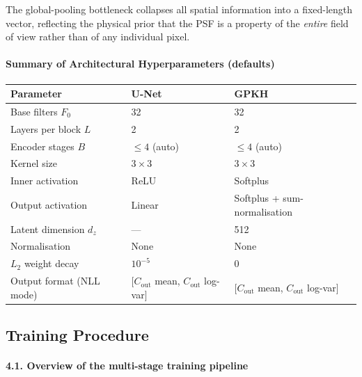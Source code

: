 \documentclass{aa}
\begin{document}
The global-pooling bottleneck collapses all spatial information into a fixed-length vector, reflecting the physical prior that the PSF is a property of the \emph{entire} field of view rather than of any individual pixel.

\paragraph{Summary of Architectural Hyperparameters (defaults)}

\begin{table}[h]
\centering
\begin{tabular}{|l|l|l|}
\hline
\textbf{Parameter} & \textbf{U-Net} & \textbf{GPKH} \\
\hline
Base filters $F_0$ & 32 & 32 \\
Layers per block $L$ & 2 & 2 \\
Encoder stages $B$ & $\leq 4$ (auto) & $\leq 4$ (auto) \\
Kernel size & $3 \times 3$ & $3 \times 3$ \\
Inner activation & ReLU & Softplus \\
Output activation & Linear & Softplus + sum-normalisation \\
Latent dimension $d_z$ & --- & 512 \\
Normalisation & None & None \\
$L_2$ weight decay & $10^{-5}$ & $0$ \\
Output format (NLL mode) & $[C_\mathrm{out}$ mean, $C_\mathrm{out}$ log-var$]$ & $[C_\mathrm{out}$ mean, $C_\mathrm{out}$ log-var$]$ \\
\hline
\end{tabular}
\end{table}


\subsection{Training Procedure}

\paragraph{4.1. Overview of the multi-stage training pipeline}
\end{document}
